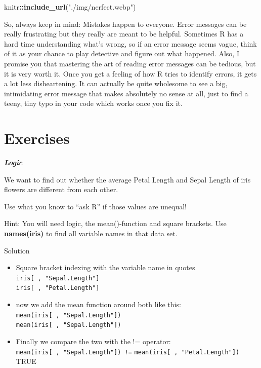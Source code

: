 \documentclass[
]{book}
\newenvironment{Shaded}{\begin{snugshade}}{\end{snugshade}}
\newcommand{\FunctionTok}[1]{\textcolor[rgb]{0.13,0.29,0.53}{\textbf{#1}}}
\newcommand{\NormalTok}[1]{#1}
\newcommand{\SpecialCharTok}[1]{\textcolor[rgb]{0.81,0.36,0.00}{\textbf{#1}}}
\newcommand{\StringTok}[1]{\textcolor[rgb]{0.31,0.60,0.02}{#1}}
\providecommand{\tightlist}{%
  \setlength{\itemsep}{0pt}\setlength{\parskip}{0pt}}
\begin{document}
\begin{Shaded}
\begin{Highlighting}[]
\NormalTok{knitr}\SpecialCharTok{::}\FunctionTok{include\_url}\NormalTok{(}\StringTok{"./img/nerfect.webp"}\NormalTok{)}
\end{Highlighting}
\end{Shaded}

So, always keep in mind: Mistakes happen to everyone.
Error messages can be really frustrating but they really are meant to be helpful.
Sometimes R has a hard time understanding what's wrong, so if an error message seems vague, think of it as your chance to play detective and figure out what happened.
Also, I promise you that mastering the art of reading error messages can be tedious, but it is very worth it.
Once you get a feeling of how R tries to identify errors, it gets a lot less disheartening.
It can actually be quite wholesome to see a big, intimidating error message that makes absolutely no sense at all, just to find a teeny, tiny typo in your code which works once you fix it.

\section*{Exercises}\label{exercises}

\textbf{\emph{Logic}}

We want to find out whether the average Petal Length and Sepal Length of iris flowers are different from each other.

Use what you know to ``ask R'' if those values are unequal!

Hint: You will need logic, the mean()-function and square brackets. Use \textbf{names(iris)} to find all variable names in that data set.

Solution

\begin{itemize}
\tightlist
\item
  Square bracket indexing with the variable name in quotes \newline
  \texttt{iris{[}\ ,\ "Sepal.Length"{]}}\\
  \texttt{iris{[}\ ,\ "Petal.Length"{]}}
\item
  now we add the mean function around both like this:
  \texttt{mean(iris{[}\ ,\ "Sepal.Length"{]})}\\
  \texttt{mean(iris{[}\ ,\ "Sepal.Length"{]})}
\item
  Finally we compare the two with the != operator:
  \texttt{mean(iris{[}\ ,\ "Sepal.Length"{]})\ !=}
  \texttt{mean(iris{[}\ ,\ "Petal.Length"{]})}\\
  TRUE
\end{itemize}
\end{document}

